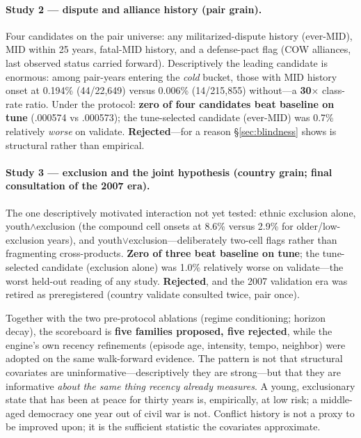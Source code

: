 \documentclass[11pt]{article}
\begin{document}
\paragraph{Study 2 --- dispute and alliance history (pair grain).} Four
candidates on the pair universe: any militarized-dispute history (ever-MID),
MID within 25 years, fatal-MID history, and a defense-pact flag (COW
alliances, last observed status carried forward). Descriptively the leading
candidate is enormous: among pair-years entering the \emph{cold} bucket,
those with MID history onset at 0.194\% (44/22{,}649) versus 0.006\%
(14/215{,}855) without---a \textbf{30$\times$} class-rate ratio. Under the
protocol: \textbf{zero of four candidates beat baseline on tune} (.000574 vs
.000573); the tune-selected candidate (ever-MID) was 0.7\% relatively
\emph{worse} on validate. \textbf{Rejected}---for a reason
\S\ref{sec:blindness} shows is structural rather than empirical.

\paragraph{Study 3 --- exclusion and the joint hypothesis (country grain;
final consultation of the 2007 era).} The one descriptively motivated
interaction not yet tested: ethnic exclusion alone, youth$\wedge$exclusion
(the compound cell onsets at 8.6\% versus 2.9\% for older/low-exclusion
years), and youth$\vee$exclusion---deliberately two-cell flags rather than
fragmenting cross-products. \textbf{Zero of three beat baseline on tune};
the tune-selected candidate (exclusion alone) was 1.0\% relatively worse on
validate---the worst held-out reading of any study. \textbf{Rejected}, and
the 2007 validation era was retired as preregistered (country validate
consulted twice, pair once).

Together with the two pre-protocol ablations (regime conditioning; horizon
decay), the scoreboard is \textbf{five families proposed, five rejected},
while the engine's own recency refinements (episode age, intensity, tempo,
neighbor) were adopted on the same walk-forward evidence. The pattern is not
that structural covariates are uninformative---descriptively they are
strong---but that they are informative \emph{about the same thing recency
already measures}. A young, exclusionary state that has been at peace for
thirty years is, empirically, at low risk; a middle-aged democracy one year
out of civil war is not. Conflict history is not a proxy to be improved
upon; it is the sufficient statistic the covariates approximate.
\end{document}
